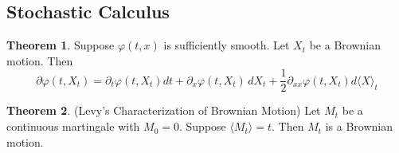 \documentclass[10pt, oneside]{article}
\theoremstyle{definition}
\newtheorem{thm}{Theorem}
\begin{document}
\subsection{Stochastic Calculus}
\begin{thm}
Suppose $\varphi(t,x)$ is sufficiently smooth. Let $X_t$ be a Brownian motion. Then 
\[\partial \varphi(t,X_t) = \partial_t \varphi(t,X_t) dt + \partial_x \varphi(t,X_t)\,dX_t + \frac{1}{2}\partial_{xx}\varphi(t,X_t)d\langle X\rangle_t\]
\end{thm}



\begin{thm}
    (Levy's Characterization of Brownian Motion) Let $M_t$ be a continuous martingale with $M_0 = 0.$ Suppose $\langle M_t\rangle = t.$ Then $M_t$ is a Brownian motion.
\end{thm}
\end{document}
